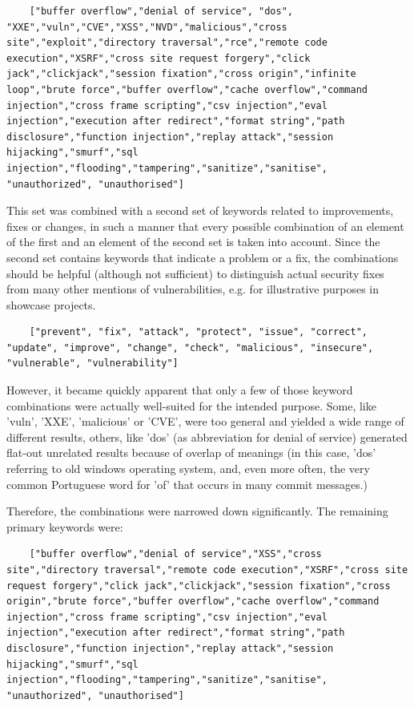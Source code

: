 \documentclass[
a4paper,
pagesize,
pdftex,
12pt,
twoside, %
BCOR=5mm, %
ngerman,
fleqn,
final,
]{scrartcl}
\begin{document}
	\lstset{basicstyle=\small}
	\begin{lstlisting}
	["buffer overflow","denial of service", "dos", "XXE","vuln","CVE","XSS","NVD","malicious","cross site","exploit","directory traversal","rce","remote code execution","XSRF","cross site request forgery","click jack","clickjack","session fixation","cross origin","infinite loop","brute force","buffer overflow","cache overflow","command injection","cross frame scripting","csv injection","eval injection","execution after redirect","format string","path disclosure","function injection","replay attack","session hijacking","smurf","sql injection","flooding","tampering","sanitize","sanitise", "unauthorized", "unauthorised"]
	\end{lstlisting}
	This set was combined with a second set of keywords related to improvements, fixes or changes, in such a manner that every possible combination of an element of the first and an element of the second set is taken into account. Since the second set contains keywords that indicate a problem or a fix, the combinations should be helpful (although not sufficient) to distinguish actual security fixes from many other mentions of vulnerabilities, e.g. for illustrative purposes in showcase projects.
	\begin{lstlisting}
	["prevent", "fix", "attack", "protect", "issue", "correct", "update", "improve", "change", "check", "malicious", "insecure", "vulnerable", "vulnerability"]
	\end{lstlisting}
	However, it became quickly apparent that only a few of those keyword combinations were actually well-suited for the intended purpose. Some, like 'vuln', 'XXE', 'malicious' or 'CVE', were too general and yielded a wide range of different results, others, like 'dos' (as abbreviation for denial of service) generated flat-out unrelated results because of overlap of meanings (in this case, 'dos' referring to old windows operating system, and, even more often, the very common Portuguese word for 'of' that occurs in many commit messages.)
	
	Therefore, the combinations were narrowed down significantly. The remaining primary keywords were:
	\begin{lstlisting}
	["buffer overflow","denial of service","XSS","cross site","directory traversal","remote code execution","XSRF","cross site request forgery","click jack","clickjack","session fixation","cross origin","brute force","buffer overflow","cache overflow","command injection","cross frame scripting","csv injection","eval injection","execution after redirect","format string","path disclosure","function injection","replay attack","session hijacking","smurf","sql injection","flooding","tampering","sanitize","sanitise", "unauthorized", "unauthorised"]
	\end{lstlisting}
	
\end{document}
